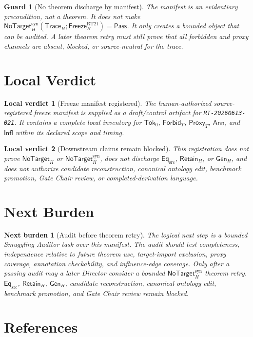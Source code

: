 \documentclass[11pt]{article}
\newcommand{\GenH}{\mathsf{Gen}_{H}}
\newcommand{\EqSrc}{\mathsf{Eq}_{\mathrm{src}}}
\newcommand{\RetainH}{\mathsf{Retain}_{H}}
\newcommand{\NoTargetH}{\mathsf{NoTarget}_{H}}
\newcommand{\NoTargetSyn}{\mathsf{NoTarget}_{H}^{\mathrm{syn}}}
\newcommand{\SrcTok}{\mathsf{Tok}_{0}}
\newcommand{\ForbidT}{\mathsf{Forbid}_{T}}
\newcommand{\ProxyT}{\mathsf{Proxy}_{T}}
\newcommand{\TraceH}{\mathsf{Trace}_{H}}
\newcommand{\Annot}{\mathsf{Ann}}
\newcommand{\Influence}{\mathsf{Infl}}
\newcommand{\FreezeH}{\mathsf{Freeze}_{H}}
\newcommand{\Pass}{\mathsf{Pass}}
\newtheorem{guard}{Guard}
\newtheorem{verdict}{Local verdict}
\newtheorem{nextburden}{Next burden}
\begin{document}
\begin{guard}[No theorem discharge by manifest]
The manifest is an evidentiary precondition, not a theorem. It does not make
\(\NoTargetSyn(\TraceH;\FreezeH^{\mathrm{RT21}})=\Pass\). It only creates a
bounded object that can be audited. A later theorem retry must still prove
that all forbidden and proxy channels are absent, blocked, or source-neutral
for the trace.
\end{guard}

\section{Local Verdict}

\begin{verdict}[Freeze manifest registered]
The human-authorized source-registered freeze manifest is supplied as a
draft/control artifact for \texttt{RT-20260613-021}. It contains a complete
local inventory for \(\SrcTok\), \(\ForbidT\), \(\ProxyT\), \(\Annot\), and
\(\Influence\) within its declared scope and timing.
\end{verdict}

\begin{verdict}[Downstream claims remain blocked]
This registration does not prove \(\NoTargetH\) or \(\NoTargetSyn\), does
not discharge \(\EqSrc\), \(\RetainH\), or \(\GenH\), and does not authorize
candidate reconstruction, canonical ontology edit, benchmark promotion, Gate
Chair review, or completed-derivation language.
\end{verdict}

\section{Next Burden}

\begin{nextburden}[Audit before theorem retry]
The logical next step is a bounded Smuggling Auditor task over this manifest.
The audit should test completeness, independence relative to future theorem
use, target-import exclusion, proxy coverage, annotation checkability, and
influence-edge coverage. Only after a passing audit may a later Director
consider a bounded \(\NoTargetSyn\) theorem retry. \(\EqSrc\), \(\RetainH\),
\(\GenH\), candidate reconstruction, canonical ontology edit, benchmark
promotion, and Gate Chair review remain blocked.
\end{nextburden}

\section*{References}
\end{document}
